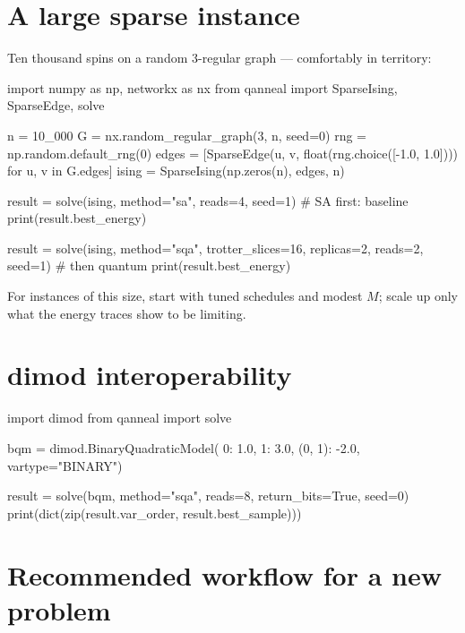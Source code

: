 \section{A large sparse instance}

Ten thousand spins on a random 3-regular graph --- comfortably in
 territory:

\begin{pycode}
import numpy as np, networkx as nx
from qanneal import SparseIsing, SparseEdge, solve

n = 10_000
G = nx.random_regular_graph(3, n, seed=0)
rng = np.random.default_rng(0)
edges = [SparseEdge(u, v, float(rng.choice([-1.0, 1.0])))
         for u, v in G.edges]
ising = SparseIsing(np.zeros(n), edges, n)

result = solve(ising, method="sa", reads=4, seed=1)   # SA first: baseline
print(result.best_energy)

result = solve(ising, method="sqa", trotter_slices=16, replicas=2,
               reads=2, seed=1)                        # then quantum
print(result.best_energy)
\end{pycode}

For instances of this size, start with  tuned schedules
and modest $M$; scale up only what the energy traces show to be limiting.

\section{dimod interoperability}

\begin{pycode}
import dimod
from qanneal import solve

bqm = dimod.BinaryQuadraticModel(
    {0: 1.0, 1: 3.0}, {(0, 1): -2.0}, vartype="BINARY")

result = solve(bqm, method="sqa", reads=8, return_bits=True, seed=0)
print(dict(zip(result.var_order, result.best_sample)))
\end{pycode}

\section{Recommended workflow for a new problem}

